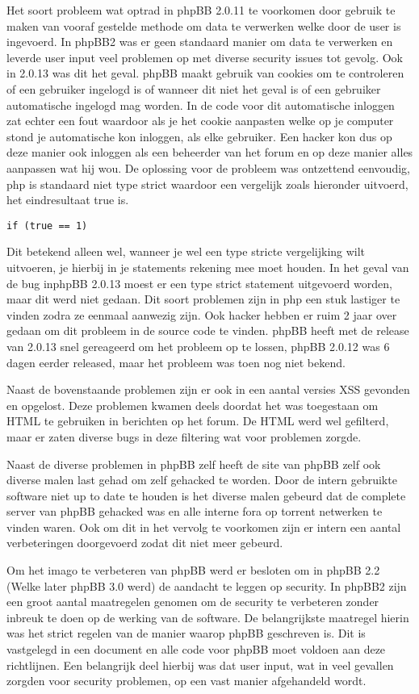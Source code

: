 Het soort probleem wat optrad in phpBB 2.0.11 te voorkomen door gebruik te maken van vooraf gestelde methode om data te verwerken welke door de user is ingevoerd. In phpBB2 was er geen standaard manier om data te verwerken en leverde user input veel problemen op met diverse security issues tot gevolg. Ook in 2.0.13 was dit het geval. phpBB maakt gebruik van cookies om te controleren of een gebruiker ingelogd is of wanneer dit niet het geval is of een gebruiker automatische ingelogd mag worden. In de code voor dit automatische inloggen zat echter een fout waardoor als je het cookie aanpasten welke op je computer stond je automatische kon inloggen, als elke gebruiker. Een hacker kon dus op deze manier ook inloggen als een beheerder van het forum en op deze manier alles aanpassen wat hij wou. De oplossing voor de probleem was ontzettend eenvoudig, php is standaard niet type strict waardoor een vergelijk zoals hieronder uitvoerd, het eindresultaat true is.
\begin{verbatim}
if (true == 1)
\end{verbatim}
Dit betekend alleen wel, wanneer je wel een type stricte vergelijking wilt uitvoeren, je hierbij in je statements rekening mee moet houden. In het geval van de bug inphpBB 2.0.13 moest er een type strict statement uitgevoerd worden, maar dit werd niet gedaan. Dit soort problemen zijn in php een stuk lastiger te vinden zodra ze eenmaal aanwezig zijn. Ook hacker hebben er ruim 2 jaar over gedaan om dit probleem in de source code te vinden. phpBB heeft met de release van 2.0.13 snel gereageerd om het probleem op te lossen, phpBB 2.0.12 was 6 dagen eerder released, maar het probleem was toen nog niet bekend.

Naast de bovenstaande problemen zijn er ook in een aantal versies XSS gevonden en opgelost. Deze problemen kwamen deels doordat het was toegestaan om HTML te gebruiken in berichten op het forum. De HTML werd wel gefilterd, maar er zaten diverse bugs in deze filtering wat voor problemen zorgde.

Naast de diverse problemen in phpBB zelf heeft de site van phpBB zelf ook diverse malen last gehad om zelf gehacked te worden. Door de intern gebruikte software niet up to date te houden is het diverse malen gebeurd dat de complete server van phpBB gehacked was en alle interne fora op torrent netwerken te vinden waren. Ook om dit in het vervolg te voorkomen zijn er intern een aantal verbeteringen doorgevoerd zodat dit niet meer gebeurd.

Om het imago te verbeteren van phpBB werd er besloten om in phpBB 2.2 (Welke later phpBB 3.0 werd\cite{bib.phpbb.2word3}) de aandacht te leggen op security. In phpBB2 zijn een groot aantal maatregelen genomen om de security te verbeteren zonder inbreuk te doen op de werking van de software. De belangrijkste maatregel hierin was het strict regelen van de manier waarop phpBB geschreven is. Dit is vastgelegd in een document\cite{bib.phpbb.codingguidelines} en alle code voor phpBB moet voldoen aan deze richtlijnen. Een belangrijk deel hierbij was dat user input, wat in veel gevallen zorgden voor security problemen, op een vast manier afgehandeld wordt.

